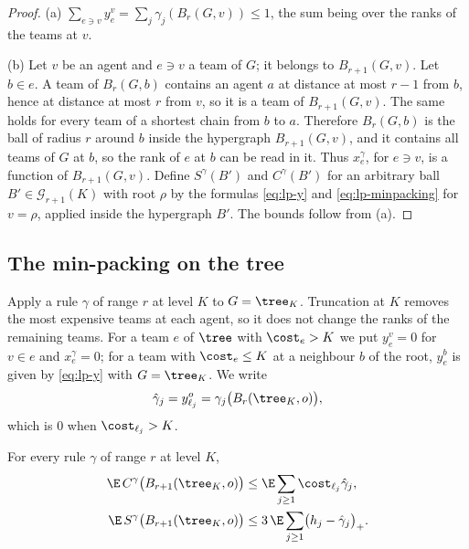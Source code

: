 \begin{proof}
(a) $\sum_{e\ni v}y^v_e=\sum_j\gamma_j(B_r(G,v))\le1$, the sum being over the ranks of the
teams at $v$.

(b) Let $v$ be an agent and $e\ni v$ a team of $G$; it belongs to $B_{r+1}(G,v)$. Let
$b\in e$. A team of $B_r(G,b)$ contains an agent $a$ at distance at most $r-1$ from $b$,
hence at distance at most $r$ from $v$, so it is a team of $B_{r+1}(G,v)$. The same holds
for every team of a shortest chain from $b$ to $a$. Therefore $B_r(G,b)$ is the ball of
radius $r$ around $b$ inside the hypergraph $B_{r+1}(G,v)$, and it contains all teams of $G$
at $b$, so the rank of $e$ at $b$ can be read in it. Thus $x^\gamma_e$, for $e\ni v$, is a
function of $B_{r+1}(G,v)$. Define $S^\gamma(B')$ and $C^\gamma(B')$ for an arbitrary ball
$B'\in\mathcal G_{r+1}(K)$ with root $\rho$ by the formulas \eqref{eq:lp-y} and
\eqref{eq:lp-minpacking} for $v=\rho$, applied inside the hypergraph $B'$. The bounds follow
from (a).
\end{proof}

\subsection{The min-packing on the tree}\label{sec:lp-tree}

Apply a rule $\gamma$ of range $r$ at level $K$ to $G=\tree_K$. Truncation at $K$ removes
the most expensive teams at each agent, so it does not change the ranks of the remaining
teams. For a team $e$ of $\tree$ with $\cost_e>K$ we put $y^v_e=0$ for $v\in e$ and
$x^\gamma_e=0$; for a team with $\cost_e\le K$ at a neighbour $b$ of the root, $y^b_e$ is
given by \eqref{eq:lp-y} with $G=\tree_K$. We write
\[
\hat\gamma_j=y^o_{\ell_j}=\gamma_j\bigl(B_r(\tree_K,o)\bigr),
\]
which is $0$ when $\cost_{\ell_j}>K$.

\begin{lemma}\label{lem:lp-tree}
For every rule $\gamma$ of range $r$ at level $K$,
\begin{align*}
\E\,C^\gamma\bigl(B_{r+1}(\tree_K,o)\bigr)&\le\E\sum_{j\ge1}\cost_{\ell_j}\hat\gamma_j,\\
\E\,S^\gamma\bigl(B_{r+1}(\tree_K,o)\bigr)&\le3\,\E\sum_{j\ge1}\bigl(h_j-\hat\gamma_j\bigr)_+ .
\end{align*}
\end{lemma}

